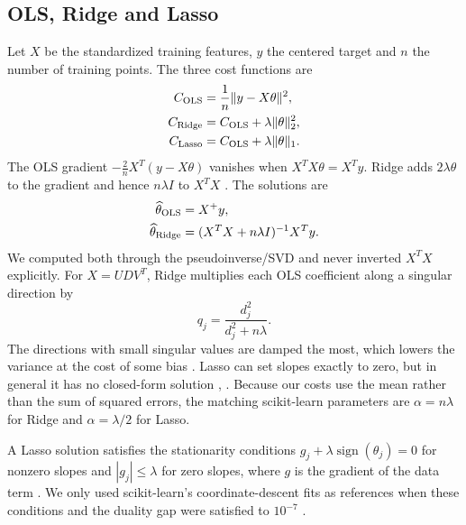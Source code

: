 \documentclass[aps,prb,reprint,superscriptaddress,nofootinbib,longbibliography,floatfix]{revtex4-2}
\begin{document}
\subsection{OLS, Ridge and Lasso}
Let $X$ be the standardized training features, $y$ the centered target and $n$ the number of training points. The three cost functions are
\begin{align}
C_{\rm OLS}&=\frac1n\|y-X\theta\|^2,\nonumber\\
C_{\rm Ridge}&=C_{\rm OLS}+\lambda\|\theta\|_2^2,\nonumber\\
C_{\rm Lasso}&=C_{\rm OLS}+\lambda\|\theta\|_1.
\end{align}
The OLS gradient $-\frac2nX^T(y-X\theta)$ vanishes when $X^TX\theta=X^Ty$. Ridge adds $2\lambda\theta$ to the gradient and hence $n\lambda I$ to $X^TX$ \cite{Hoerl1970}. The solutions are
\begin{align}
\widehat\theta_{\rm OLS}&=X^+y,\nonumber\\
\widehat\theta_{\rm Ridge}&=(X^TX+n\lambda I)^{-1}X^Ty.
\end{align}
We computed both through the pseudoinverse/SVD and never inverted $X^TX$ explicitly. For $X=UDV^T$, Ridge multiplies each OLS coefficient along a singular direction by
\begin{equation}
q_j=\frac{d_j^2}{d_j^2+n\lambda}.
\end{equation}
The directions with small singular values are damped the most, which lowers the variance at the cost of some bias \cite[Secs.~3.3 and 3.8]{HjorthJensen2026}. Lasso can set slopes exactly to zero, but in general it has no closed-form solution \cite{Tibshirani1996}, \cite[Sec.~3.9]{HjorthJensen2026}. Because our costs use the mean rather than the sum of squared errors, the matching scikit-learn parameters are $\alpha=n\lambda$ for Ridge and $\alpha=\lambda/2$ for Lasso.

A Lasso solution satisfies the stationarity conditions $g_j+\lambda\operatorname{sign}(\theta_j)=0$ for nonzero slopes and $|g_j|\leq\lambda$ for zero slopes, where $g$ is the gradient of the data term \cite[Sec.~3.9]{HjorthJensen2026}. We only used scikit-learn's coordinate-descent fits as references when these conditions and the duality gap were satisfied to $10^{-7}$ \cite{SklearnLasso}.
\end{document}
